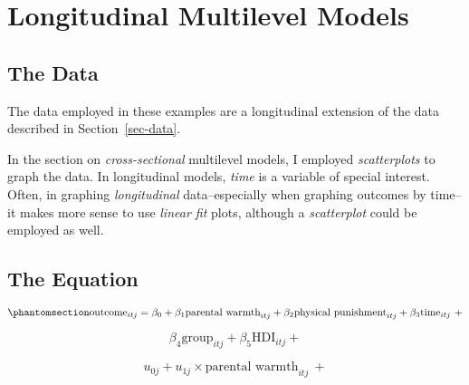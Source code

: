 \documentclass[
  letterpaper,
  DIV=11,
  numbers=noendperiod]{scrreprt}
\begin{document}

\chapter{Longitudinal Multilevel
Models}\label{longitudinal-multilevel-models}

\section{The Data}\label{the-data}

The data employed in these examples are a longitudinal extension of the
data described in Section~\ref{sec-data}.

\begin{tcolorbox}[enhanced jigsaw, opacityback=0, arc=.35mm, coltitle=black, colframe=quarto-callout-tip-color-frame, toptitle=1mm, colbacktitle=quarto-callout-tip-color!10!white, toprule=.15mm, colback=white, left=2mm, bottomtitle=1mm, bottomrule=.15mm, title=\textcolor{quarto-callout-tip-color}{\faLightbulb}\hspace{0.5em}{Graphing Longitudinal Data}, rightrule=.15mm, opacitybacktitle=0.6, titlerule=0mm, leftrule=.75mm, breakable]

In the section on \emph{cross-sectional} multilevel models, I employed
\emph{scatterplots} to graph the data. In longitudinal models,
\emph{time} is a variable of special interest. Often, in graphing
\emph{longitudinal} data--especially when graphing outcomes by time--it
makes more sense to use \emph{linear fit} plots, although a
\emph{scatterplot} could be employed as well.

\end{tcolorbox}

\section{The Equation}\label{the-equation-2}

\begin{equation}\phantomsection\label{eq-MLM-longitudinal}{\text{outcome}_{itj} = \beta_0 + \beta_1 \text{parental warmth}_{itj} + \beta_2 \text{physical punishment}_{itj} + \beta_3 \text{time}_{itj} \ + }\end{equation}

\[\beta_4 \text{group}_{itj} + \beta_5 \text{HDI}_{itj} +\]

\[u_{0j} + u_{1j} \times \text{parental warmth}_{itj} \ + \]
\end{document}
